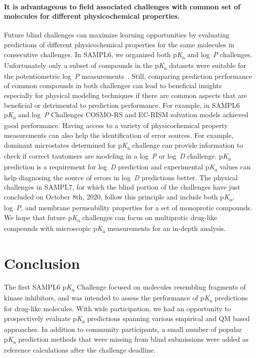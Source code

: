 \documentclass[9pt,lineno,final]{elife}
\newcommand{\pKa}{p\textit{K}\textsubscript{a}}
\newcommand{\logD}{log~\textit{D}}
\newcommand{\logP}{log~\textit{P}}
\begin{document}
\paragraph{It is advantageous to field associated challenges with common set of molecules for different physicochemical properties.}
Future blind challenges can maximize learning opportunities by evaluating predictions of different physicochemical properties for the same molecules in consecutive challenges. 
In SAMPL6, we organized both \pKa{} and \logP{} challenges. 
Unfortunately only a subset of compounds in the \pKa{} datasets were suitable for the potentiometric \logP{} measurements~\cite{Isik:2018:J.Comput.AidedMol.Des.}. 
Still, comparing prediction performance of common compounds in both challenges can lead to beneficial insights especially for physical modeling techniques if there are common aspects that are beneficial or detrimental to prediction performance. 
For example, in SAMPL6 \pKa{} and \logP{} Challenges COSMO-RS and EC-RISM solvation models achieved good performance.
Having access to a variety of physicochemical property measurements can also help the identification of error sources.
For example, dominant microstates determined for \pKa{} challenge can provide information to check if correct tautomers are modeling in a \logP{} or \logD{} challenge.
\pKa{} prediction is a requirement for \logD{} prediction and experimental \pKa{} values can help diagnosing the source of errors in \logD{} predictions better. 
The physical challenges in SAMPL7, for which the blind portion of the challenges have just concluded on October 8th, 2020, follow this principle and include both \pKa{}, \logP{}, and membrane permeability properties for a set of monoprotic compounds. 
We hope that future \pKa{} challenges can focus on multiprotic drug-like compounds with microscopic \pKa{} measurements for an in-depth analysis.



\section{Conclusion}

The first SAMPL6 \pKa{} Challenge focused on molecules resembling fragments of kinase inhibitors, and was intended to assess the performance of \pKa{} predictions for drug-like molecules. 
With wide participation, we had an opportunity to prospectively evaluate \pKa{} predictions spanning various empirical and QM based approaches. 
In addition to community participants, a small number of popular \pKa{} prediction methods that were missing from blind submissions were added as reference calculations after the challenge deadline. 
\end{document}
